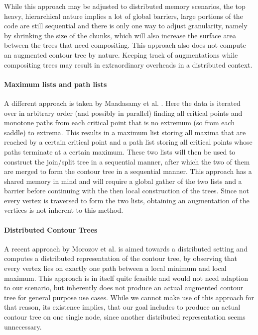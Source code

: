 \documentclass{scrartcl}
\begin{document}
While this approach may be adjusted to distributed memory scenarios, the top heavy, hierarchical nature implies a lot of global barriers, large portions of the code are still sequential and there is only one way to adjust granularity, namely by shrinking the size of the chunks, which will also increase the surface area between the trees that need compositing. This approach also does not compute an augmented contour tree by nature. Keeping track of augmentations while compositing trees may result in extraordinary overheads in a distributed context.

\paragraph{Maximum lists and path lists}
A different approach is taken by Maadasamy et al. \cite{Maadasamy}. Here the data is iterated over in arbitrary order (and possibly in parallel) finding all critical points and monotone paths from each critical point that is no extremum (so from each saddle) to extrema. This results in a maximum list storing all maxima that are reached by a certain critical point and a path list storing all critical points whose paths terminate at a certain maximum. These two lists will then be used to construct the join/split tree in a sequential manner, after which the two of them are merged to form the contour tree in a sequential manner.
This approach has a shared memory in mind and will require a global gather of the two lists and a barrier before continuing with the then local construction of the trees. Since not every vertex is traversed to form the two lists, obtaining an augmentation of the vertices is not inherent to this method.

\paragraph{Distributed Contour Trees}
A recent approach by Morozov et al. \cite{Morozov} is aimed towards a distributed setting and computes a distributed representation of the contour tree, by observing that every vertex lies on exactly one path between a local minimum and local maximum. This approach is in itself quite feasible and would not need adaption to our scenario, but inherently does not produce an actual augmented contour tree for general purpose use cases. While we cannot make use of this approach for that reason, its existence implies, that our goal includes to produce an actual contour tree on one single node, since another distributed representation seems unnecessary. 
\end{document}
